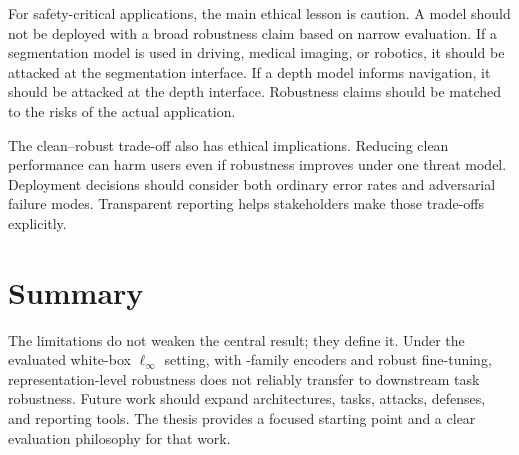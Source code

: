 For safety-critical applications, the main ethical lesson is caution. A model should not be deployed with a broad robustness claim based on narrow evaluation. If a segmentation model is used in driving, medical imaging, or robotics, it should be attacked at the segmentation interface. If a depth model informs navigation, it should be attacked at the depth interface. Robustness claims should be matched to the risks of the actual application.

The clean--robust trade-off also has ethical implications. Reducing clean performance can harm users even if robustness improves under one threat model. Deployment decisions should consider both ordinary error rates and adversarial failure modes. Transparent reporting helps stakeholders make those trade-offs explicitly.

\section{Summary}

The limitations do not weaken the central result; they define it. Under the evaluated white-box $\ell_\infty$ setting, with \DINO-family encoders and \DeACL robust fine-tuning, representation-level robustness does not reliably transfer to downstream task robustness. Future work should expand architectures, tasks, attacks, defenses, and reporting tools. The thesis provides a focused starting point and a clear evaluation philosophy for that work.
